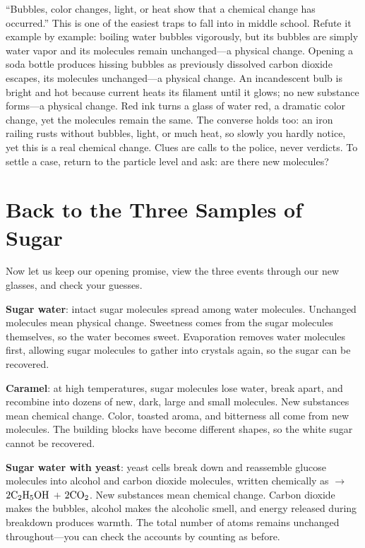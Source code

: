 \begin{wuqu}
``Bubbles, color changes, light, or heat show that a chemical change has occurred.'' This is one of the easiest traps to fall into in middle school. Refute it example by example: boiling water bubbles vigorously, but its bubbles are simply water vapor and its molecules remain unchanged---a physical change. Opening a soda bottle produces hissing bubbles as previously dissolved carbon dioxide escapes, its molecules unchanged---a physical change. An incandescent bulb is bright and hot because current heats its filament until it glows; no new substance forms---a physical change. Red ink turns a glass of water red, a dramatic color change, yet the molecules remain the same. The converse holds too: an iron railing rusts without bubbles, light, or much heat, so slowly you hardly notice, yet this is a real chemical change. Clues are calls to the police, never verdicts. To settle a case, return to the particle level and ask: are there new molecules?
\end{wuqu}

\section{Back to the Three Samples of Sugar}

Now let us keep our opening promise, view the three events through our new glasses, and check your guesses.

\textbf{Sugar water}: intact sugar molecules spread among water molecules. Unchanged molecules mean physical change. Sweetness comes from the sugar molecules themselves, so the water becomes sweet. Evaporation removes water molecules first, allowing sugar molecules to gather into crystals again, so the sugar can be recovered.

\textbf{Caramel}: at high temperatures, sugar molecules lose water, break apart, and recombine into dozens of new, dark, large and small molecules. New substances mean chemical change. Color, toasted aroma, and bitterness all come from new molecules. The building blocks have become different shapes, so the white sugar cannot be recovered.

\textbf{Sugar water with yeast}: yeast cells break down and reassemble glucose molecules into alcohol and carbon dioxide molecules, written chemically as  $\rightarrow$ $2\mathrm{C_2H_5OH}$ $+$ $2\mathrm{CO_2}$. New substances mean chemical change. Carbon dioxide makes the bubbles, alcohol makes the alcoholic smell, and energy released during breakdown produces warmth. The total number of atoms remains unchanged throughout---you can check the accounts by counting as before.

